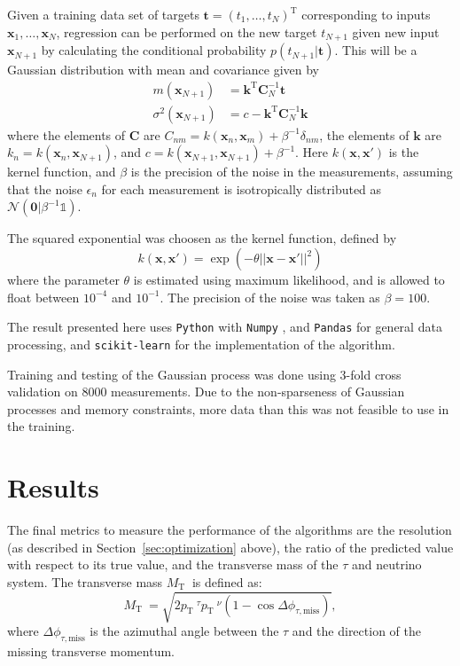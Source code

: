 \documentclass[twocolumn]{scrartcl}
\newcommand{\pt}{\ensuremath{p_\text{T}}~}
\newcommand{\mt}{\ensuremath{M_\text{T}}~}
\begin{document}
Given a training data set of targets $\mathbf t = (t_1,\ldots,t_N)^\text{T}$ corresponding to inputs $\mathbf x_1,\ldots,\mathbf x_N$, regression can be performed on the new target $t_{N+1}$ given new input $\mathbf x_{N+1}$ by calculating the conditional probability $p(t_{N+1}|\mathbf t)$. This will be a Gaussian distribution with mean and covariance given by
\begin{align}
    m(\mathbf x_{N+1}) &= \mathbf k^\text{T} \mathbf C^{-1}_N \mathbf t \\
    \sigma^2(\mathbf x_{N+1}) &= c - \mathbf k^\text{T} \mathbf C^{-1}_N \mathbf k
\end{align}
where the elements of $\mathbf C$ are $C_{nm} = k(\mathbf x_n, \mathbf x_m) + \beta^{-1}\delta_{nm}$, the elements of $\mathbf k$ are $k_n = k(\mathbf x_n, \mathbf x_{N+1})$, and $c = k(\mathbf x_{N+1}, \mathbf x_{N+1}) + \beta^{-1}$. Here $k(\mathbf x, \mathbf x')$ is the kernel function, and $\beta$ is the precision of the noise in the measurements, assuming that the noise $\epsilon_n$ for each measurement is isotropically distributed as $\mathcal N(\mathbf 0 | \beta^{-1}\mathbb 1)$.

The squared exponential was choosen as the kernel function, defined by
\begin{equation}
    k(\mathbf x, \mathbf x') = \exp( -\theta ||\mathbf x - \mathbf x'||^2 )
\end{equation}
where the parameter $\theta$ is estimated using maximum likelihood, and is allowed to float between $10^{-4}$ and $10^{-1}$. The precision of the noise was taken as $\beta = 100$. 

The result presented here uses \texttt{Python} with \texttt{Numpy} \cite{numpy}, and \texttt{Pandas} \cite{pandas} for general data processing, and \texttt{scikit-learn} \cite{scikit-learn} for the implementation of the algorithm.

Training and testing of the Gaussian process was done using 3-fold cross validation on 8000 measurements. Due to the non-sparseness of Gaussian processes and memory constraints, more data than this was not feasible to use in the training.
\section{Results}
\label{sec:results}

The final metrics to measure the performance of the algorithms are the resolution (as described in Section~\ref{sec:optimization} above), the ratio of the predicted value with respect to its true value, and the transverse mass of the $τ$ and neutrino system. The transverse mass $\mt$ is defined as:
\begin{equation}
  \label{eq:mt}
  \mt=\sqrt{ 2 \pt^\tau \pt^\nu   (1-\cos \Delta\phi_{\tau,\text{miss}}) },
\end{equation}
where $\Delta\phi_{\tau,\text{miss}}$ is the azimuthal angle between the $\tau$ and the direction of the missing transverse momentum. 
\end{document}
